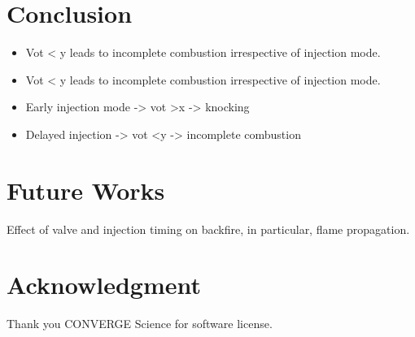 \documentclass[conference]{IEEEtran}
\begin{document}
\section{Conclusion}
\begin{itemize}
    \item Vot < y leads to incomplete combustion irrespective of injection mode.
    \item Vot < y leads to incomplete combustion irrespective of injection mode.
    \item Early injection mode -> vot >x -> knocking
    \item Delayed injection -> vot <y -> incomplete combustion
\end{itemize}


\section{Future Works}
Effect of valve and injection timing on backfire, in particular, flame propagation.

\section*{Acknowledgment}
Thank you CONVERGE Science for software license.
\end{document}
